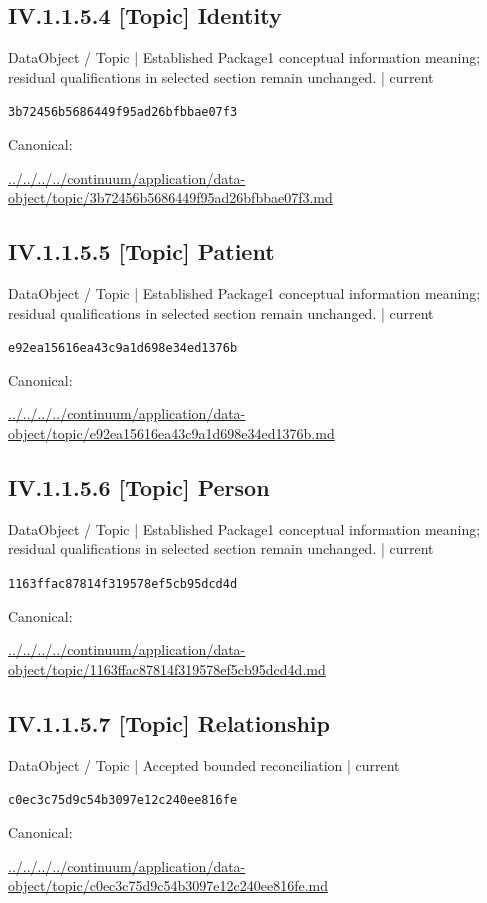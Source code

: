 \documentclass[10pt,a4paper]{article}
\begin{document}
\subsection*{IV.1.1.5.4 [Topic] Identity}
{\small DataObject / Topic | Established Package1 conceptual information meaning; residual qualifications in selected section remain unchanged. | current}\par
\texttt{3b72456b5686449f95ad26bfbbae07f3}\par
Canonical: \par
{\footnotesize\url{../../../../continuum/application/data-object/topic/3b72456b5686449f95ad26bfbbae07f3.md}}\par
\subsection*{IV.1.1.5.5 [Topic] Patient}
{\small DataObject / Topic | Established Package1 conceptual information meaning; residual qualifications in selected section remain unchanged. | current}\par
\texttt{e92ea15616ea43c9a1d698e34ed1376b}\par
Canonical: \par
{\footnotesize\url{../../../../continuum/application/data-object/topic/e92ea15616ea43c9a1d698e34ed1376b.md}}\par
\subsection*{IV.1.1.5.6 [Topic] Person}
{\small DataObject / Topic | Established Package1 conceptual information meaning; residual qualifications in selected section remain unchanged. | current}\par
\texttt{1163ffac87814f319578ef5cb95dcd4d}\par
Canonical: \par
{\footnotesize\url{../../../../continuum/application/data-object/topic/1163ffac87814f319578ef5cb95dcd4d.md}}\par
\subsection*{IV.1.1.5.7 [Topic] Relationship}
{\small DataObject / Topic | Accepted bounded reconciliation | current}\par
\texttt{c0ec3c75d9c54b3097e12c240ee816fe}\par
Canonical: \par
{\footnotesize\url{../../../../continuum/application/data-object/topic/c0ec3c75d9c54b3097e12c240ee816fe.md}}\par
\end{document}
